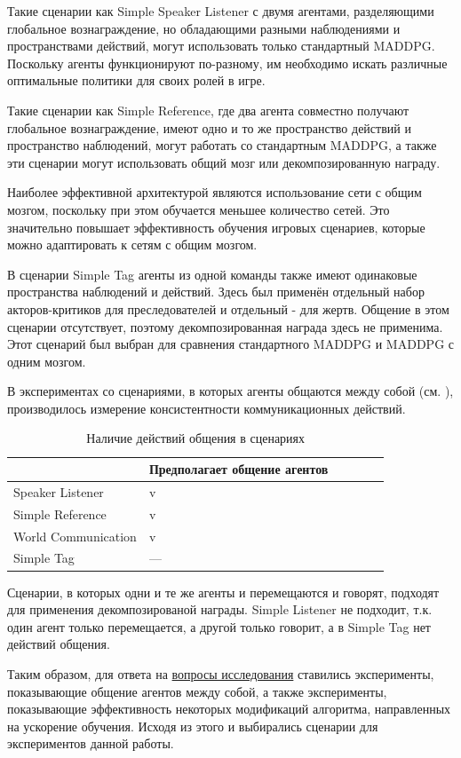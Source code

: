 Такие сценарии как Simple Speaker Listener с двумя агентами, разделяющими глобальное вознаграждение, но обладающими разными наблюдениями и пространствами действий, могут использовать только стандартный MADDPG. Поскольку агенты функционируют по-разному, им необходимо искать различные оптимальные политики для своих ролей в игре.

Такие сценарии как Simple Reference, где два агента совместно получают глобальное вознаграждение, имеют одно и то же пространство действий и пространство наблюдений, могут работать со стандартным MADDPG, а также эти сценарии могут использовать общий мозг или декомпозированную награду.

Наиболее эффективной архитектурой являются использование сети с общим мозгом, поскольку при этом обучается меньшее количество сетей. Это значительно повышает эффективность обучения игровых сценариев, которые можно адаптировать к сетям с общим мозгом.

В сценарии Simple Tag агенты из одной команды также имеют одинаковые пространства наблюдений и действий. Здесь был применён отдельный набор акторов-критиков для преследователей и отдельный - для жертв. Общение в этом сценарии отсутствует, поэтому декомпозированная награда здесь не применима. Этот сценарий был выбран для сравнения стандартного MADDPG и MADDPG с одним мозгом.

В экспериментах со сценариями, в которых агенты общаются между собой (см. ), производилось измерение консистентности коммуникационных действий.

\begin{table}[t!]
    \centering\small
    \caption{Наличие действий общения в сценариях}
    \label{tab-communicational-scenarious}
    \begin{tabular}{|l|l|l|l|l|l|}
        \hline
        & Предполагает общение агентов \\
        \hline
        Speaker Listener    & v                            \\
        \hline
        Simple Reference    & v                            \\
        \hline
        World Communication & v                            \\
        \hline
        Simple Tag          & ---                          \\
        \hline
    \end{tabular}
    \normalsize%
\end{table}

Сценарии, в которых одни и те же агенты и перемещаются и говорят, подходят для применения декомпозированой награды. Simple Listener не подходит, т.к. один агент только перемещается, а другой только говорит, а в Simple Tag нет действий общения.

Таким образом, для ответа на \hyperref[intro-questions]{вопросы исследования} ставились эксперименты, показывающие общение агентов между собой, а также эксперименты, показывающие эффективность некоторых модификаций алгоритма, направленных на ускорение обучения. Исходя из этого и выбирались сценарии для экспериментов данной работы.
